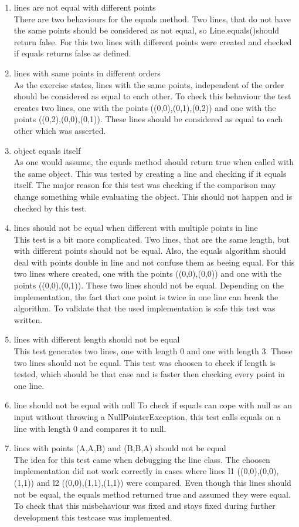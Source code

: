 \begin{enumerate}
    \item lines are not equal with different points \\
    There are two behaviours for the equals method. Two lines, that do not have the same points should be considered as not equal, so Line.equals()should return false. For this two lines with different points were created and checked if equals returns false as defined.
    \item lines with same points in different orders \\
    As the exercise states, lines with the same points, independent of the order should be considered as equal to each other. To check this behaviour the test creates two lines, one with the points ((0,0),(0,1),(0,2)) and one with the points ((0,2),(0,0),(0,1)). These lines should be considered as equal to each other which was asserted.
    \item object equals itself \\
    As one would assume, the equals method should return true when called with the same object. This was tested by creating a line and checking if it equals itself. The major reason for this test was checking if the comparison may change something while evaluating the object. This should not happen and is checked by this test.
    \item lines should not be equal when different with multiple points in line \\
    This test is a bit more complicated. Two lines, that are the same length, but with different points should not be equal. Also, the equals algorithm should deal with points double in line and not confuse them as beeing equal. For this two lines where created, one with the points ((0,0),(0,0)) and one with the points ((0,0),(0,1)). These two lines should not be equal. Depending on the implementation, the fact that one point is twice in one line can break the algorithm. To validate that the used implementation is safe this test was written.
    \item lines with different length should not be equal \\
    This test generates two lines, one with length 0 and one with length 3. Those two lines should not be equal. This test was choosen to check if length is tested, which should be that case and is faster then checking every point in one line.
    \item line should not be equal with null
    To check if equals can cope with null as an input without throwing a NullPointerException, this test calls equals on a line with length 0 and compares it to null.
    \item lines with points (A,A,B) and (B,B,A) should not be equal \\
    The idea for this test came when debugging the line class. The choosen implementation did not work correctly in cases where lines l1 ((0,0),(0,0),(1,1)) and l2 ((0,0),(1,1),(1,1)) were compared. Even though this lines should not be equal, the equals method returned true and assumed they were equal. To check that this misbehaviour was fixed and stays fixed during further development this testcase was implemented.
\end{enumerate}

